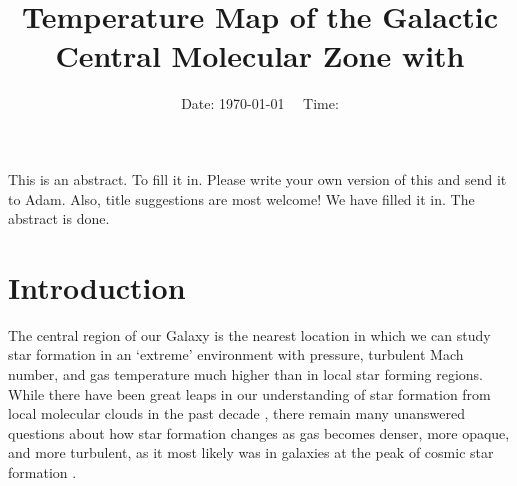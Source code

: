 



\title{Temperature Map of the Galactic Central Molecular Zone with \formaldehyde}


\date{Date: \today ~~ Time: \currenttime}

\abstract
{This is an abstract.}
{To fill it in.}
{Please write your own version of this and send it to Adam.
Also, title suggestions are most welcome!}
{We have filled it in.}
{The abstract is done.}



\maketitle


\section{Introduction}
The central region of our Galaxy is the nearest location in which we can study
star formation in an `extreme' environment with pressure, turbulent Mach number, 
and gas temperature much higher than in local star forming regions.  While
there have been great leaps in our understanding of star formation
from local molecular clouds in the past decade
\citep{Lada2012a,Heiderman2010a,Lada2010a}, there remain many unanswered
questions about how star formation changes as gas becomes denser, more opaque,
and more turbulent, as it most likely was in galaxies at the peak of cosmic
star formation \citep{Kruijssen2013a}.


